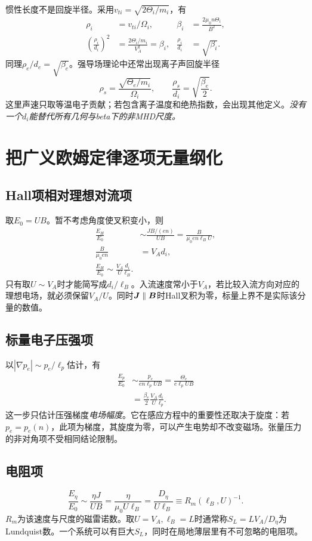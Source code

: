 惯性长度不是回旋半径。采用$v_{ti}=\sqrt{2\Theta_i/m_i}$，有
\begin{align}
\rho_i&=v_{ti}/\Omega_i,&
\beta_i&=\frac{2\mu_0n\Theta_i}{B^2},\\
\left(\frac{\rho_i}{d_i}\right)^2
&=\frac{2\Theta_i/m_i}{V_A^2}=\beta_i,
&\frac{\rho_i}{d_i}&=\sqrt{\beta_i}.
\end{align}
同理$\rho_e/d_e=\sqrt{\beta_e}$。强导场理论中还常出现离子声回旋半径
\begin{equation}
\rho_s=\frac{\sqrt{\Theta_e/m_i}}{\Omega_i},\qquad
\frac{\rho_s}{d_i}=\sqrt{\frac{\beta_e}{2}}.
\end{equation}
这里声速只取等温电子贡献；若包含离子温度和绝热指数，会出现其他定义。\emph{没有一个$d_i$能替代所有几何与beta下的非MHD尺度。}

\section{把广义欧姆定律逐项无量纲化}
\subsection{Hall项相对理想对流项}
取$E_0=UB$。暂不考虑角度使叉积变小，则
\begin{align}
\frac{E_H}{E_0}&\sim\frac{JB/(en)}{UB}
=\frac{B}{\mu_0en\ell_BU},\\
\frac{B}{\mu_0en}&=V_Ad_i,\\
\boxed{\frac{E_H}{E_0}\sim\frac{V_A}{U}\frac{d_i}{\ell_B}}.
\end{align}
只有取$U\sim V_A$时才能简写成$d_i/\ell_B$。入流速度常小于$V_A$，若比较入流方向对应的理想电场，就必须保留$V_A/U$。同时$\bm{J}\parallel\bm{B}$时Hall叉积为零，标量上界不是实际该分量的数值。

\subsection{标量电子压强项}
以$|\nabla p_e|\sim p_e/\ell_p$估计，有
\begin{align}
\frac{E_p}{E_0}&\sim\frac{p_e}{en\ell_pUB}
=\frac{\Theta_e}{e\ell_pUB}\\
&=\frac{\beta_e}{2}\frac{V_A}{U}\frac{d_i}{\ell_p}.
\end{align}
这一步只估计压强梯度\emph{电场幅度}。它在感应方程中的重要性还取决于旋度：若$p_e=p_e(n)$，此项为梯度，其旋度为零，可以产生电势却不改变磁场。张量压力的非对角项不受相同结论限制。

\subsection{电阻项}
\begin{equation}
\frac{E_\eta}{E_0}\sim\frac{\eta J}{UB}
=\frac{\eta}{\mu_0U\ell_B}
=\frac{D_\eta}{U\ell_B}
\equiv R_m(\ell_B,U)^{-1}.
\end{equation}
$R_m$为该速度与尺度的磁雷诺数。取$U=V_A,\ell_B=L$时通常称$S_L=LV_A/D_\eta$为Lundquist数。一个系统可以有巨大$S_L$，同时在局地薄层里有不可忽略的电阻项。

